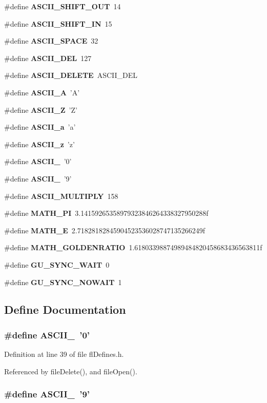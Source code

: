 \begin{CompactItemize}
$$\#define {\bf ASCII\_\-SHIFT\_\-OUT}~14
\item 
\#define {\bf ASCII\_\-SHIFT\_\-IN}~15
\item 
\#define {\bf ASCII\_\-SPACE}~32
\item 
\#define {\bf ASCII\_\-DEL}~127
\item 
\#define {\bf ASCII\_\-DELETE}~ASCII\_\-DEL
\item 
\#define {\bf ASCII\_\-A}~'A'
\item 
\#define {\bf ASCII\_\-Z}~'Z'
\item 
\#define {\bf ASCII\_\-a}~'a'
\item 
\#define {\bf ASCII\_\-z}~'z'
\item 
\#define {\bf ASCII\_}~'0'
\item 
\#define {\bf ASCII\_}~'9'
\item 
\#define {\bf ASCII\_\-MULTIPLY}~158
\item 
\#define {\bf MATH\_\-PI}~3.14159265358979323846264338327950288f
\item 
\#define {\bf MATH\_\-E}~2.71828182845904523536028747135266249f
\item 
\#define {\bf MATH\_\-GOLDENRATIO}~1.61803398874989484820458683436563811f
\item 
\#define {\bf GU\_\-SYNC\_\-WAIT}~0
\item 
\#define {\bf GU\_\-SYNC\_\-NOWAIT}~1
\end{CompactItemize}


\subsection{Define Documentation}
\subsubsection{\setlength{\rightskip}{0pt plus 5cm}\#define ASCII\_~'0'}\label{flDefines_8h_a3f75ad2972ec8996ce5206feac0e52c}




Definition at line 39 of file fl\-Defines.h.

Referenced by file\-Delete(), and file\-Open().
\subsubsection{\setlength{\rightskip}{0pt plus 5cm}\#define ASCII\_~'9'}\label{flDefines_8h_7d01b034dc2511a5f77fdd9a742b10f2}




